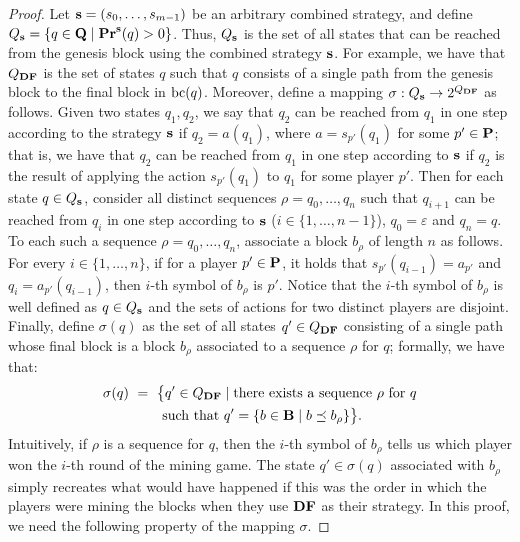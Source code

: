 \begin{proof}
Let $\mathbf{s}= (s_0, \ldots, s_{m-1})$ be an arbitrary combined strategy, and define $Q_{\mathbf{s}} = \{q \in \mathbf{Q} \mid \mathbf{Pr}^{\mathbf{s}}(q) > 0\}$. Thus, $Q_{\mathbf{s}}$ is the set of all states that can be reached from the genesis block using the combined strategy $\mathbf{s}$. For example, we have that $Q_{\text{\rm {\bf DF}}}$ is the set of states $q$ such that $q$ consists of a single path from the genesis block to the final block in $\text{bc}(q)$.
Moreover, define a mapping $\sigma: Q_{\mathbf{s}} \rightarrow 2^{Q_{\text{\rm {\bf DF}}}}$ as follows. Given two states $q_1, q_2$, we say that $q_2$ can be reached from $q_1$ in one step according to the strategy $\mathbf{s}$ if $q_2 = a(q_1)$, where $a = s_{p'}(q_1)$ for some $p' \in \mathbf{P}$;
that is, we have that $q_2$ can be reached from $q_1$ in one step according to $\mathbf{s}$ if $q_2$ is the result of applying the action $s_{p'}(q_1)$ to $q_1$ for some player $p'$.
Then for each state $q \in Q_{\mathbf{s}}$, consider all distinct sequences $\rho = q_0,\dots,q_n$ such that $q_{i+1}$ can be reached from 
$q_i$ in one step according to $\mathbf{s}$ ($i \in \{1, \ldots, n-1\}$), $q_0 = \varepsilon$ and $q_n = q$. To each such a sequence $\rho = q_0,\dots,q_n$, associate a block $b_\rho$ of length $n$ as follows.
For every $i \in \{1, \ldots, n\}$, if for a player $p' \in \mathbf{P}$, it holds that $s_{p'}(q_{i-1}) = a_{p'}$ and $q_{i} = a_{p'}(q_{i-1})$, then $i$-th symbol of $b_\rho$ is $p'$. Notice that the $i$-th symbol of $b_\rho$ is well defined as $q \in Q_{\mathbf{s}}$ and the sets of actions for two distinct players are disjoint.
Finally, define $\sigma(q)$ as the set of all states $q' \in Q_{\text{\rm {\bf DF}}}$ consisting of a single path whose final block is a block $b_\rho$ associated to a sequence $\rho$ for $q$; formally, we have that:
\begin{multline*}
\sigma(q) \ = \ \big\{q' \in Q_{\text{\rm {\bf DF}}} \mid \text{there exists a sequence } \rho \text{ for } q\\ \text{ such that } q' = \{ b \in \mathbf{B} \mid b \preceq b_\rho \}\big\}.
\end{multline*}
Intuitively, if $\rho$ is a sequence for $q$, then the $i$-th symbol of $b_{\rho}$ tells us which player won the $i$-th round of the mining game. The state $q'\in \sigma(q)$ associated with $b_\rho$ simply recreates what would have happened if this was the order in which the players were mining the blocks when they use $\text{\rm {\bf DF}}$ as their strategy.
%
In this proof, we need the following property of the mapping $\sigma$.


\end{proof}
